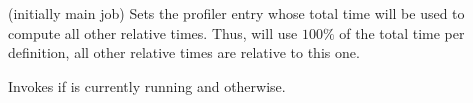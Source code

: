 \begin{command}{\pgfprofilesetrel{} (initially main job)}
	Sets the profiler entry whose total time will be used to compute all other relative times. Thus,  will use $100\%$ of the total time per definition, all other relative times are relative to this one.
\end{command}

\begin{command}{\pgfprofileifisrunning{}}
	Invokes  if  is currently running and  otherwise.
\end{command}
